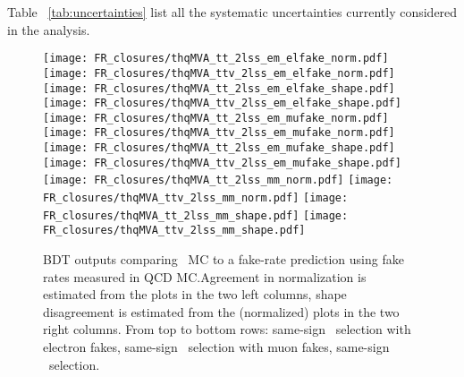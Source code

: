 Table ~\ref{tab:uncertainties} list all the systematic uncertainties currently considered in the analysis.
\clearpage
\begin{figure}[htb]
 \centering
 \texttt{[image: FR\_closures/thqMVA\_tt\_2lss\_em\_elfake\_norm.pdf]} 
 \texttt{[image: FR\_closures/thqMVA\_ttv\_2lss\_em\_elfake\_norm.pdf]} 
 \texttt{[image: FR\_closures/thqMVA\_tt\_2lss\_em\_elfake\_shape.pdf]} 
 \texttt{[image: FR\_closures/thqMVA\_ttv\_2lss\_em\_elfake\_shape.pdf]}\\ 
 \texttt{[image: FR\_closures/thqMVA\_tt\_2lss\_em\_mufake\_norm.pdf]} 
 \texttt{[image: FR\_closures/thqMVA\_ttv\_2lss\_em\_mufake\_norm.pdf]} 
 \texttt{[image: FR\_closures/thqMVA\_tt\_2lss\_em\_mufake\_shape.pdf]} 
 \texttt{[image: FR\_closures/thqMVA\_ttv\_2lss\_em\_mufake\_shape.pdf]}\\ 
 \texttt{[image: FR\_closures/thqMVA\_tt\_2lss\_mm\_norm.pdf]} 
 \texttt{[image: FR\_closures/thqMVA\_ttv\_2lss\_mm\_norm.pdf]} 
 \texttt{[image: FR\_closures/thqMVA\_tt\_2lss\_mm\_shape.pdf]} 
 \texttt{[image: FR\_closures/thqMVA\_ttv\_2lss\_mm\_shape.pdf]} \\
\caption[Fake rates closure test.]{BDT outputs comparing \ttbar\ MC to a fake-rate prediction using fake rates measured in QCD MC.\@ Agreement in normalization is estimated from the plots in the two left columns, shape disagreement is estimated from the  (normalized) plots in the two right columns. From top to bottom rows: same-sign \emu\ selection with electron fakes, same-sign \emu\ selection with muon fakes, same-sign \mumu\ selection.} 
\label{fig:frclosure_2lss_ee}
\end{figure} 
\clearpage
